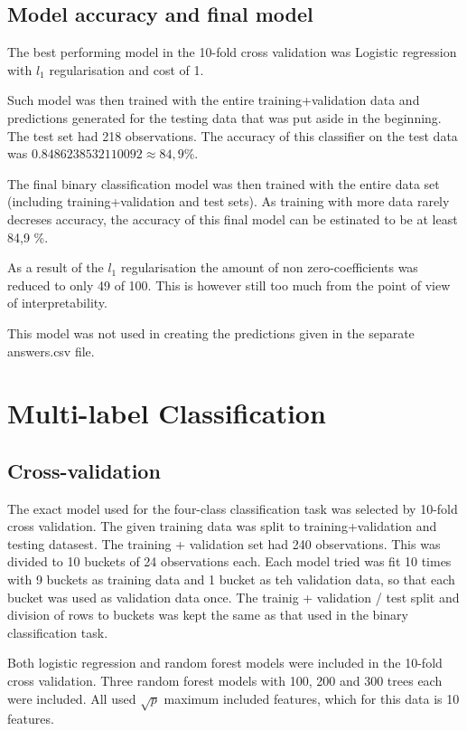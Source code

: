\documentclass[a4size, 12pt]{report}
\begin{document}
	
\subsection*{Model accuracy and final model}
	
	The best performing model in the 10-fold cross validation was Logistic regression with $l_1$ regularisation and cost of 1. 
	
	Such model was then trained with the entire training+validation data and predictions generated for the testing data that was put aside in the beginning. The test set had 218 observations. The accuracy of this classifier on the test data was $0.8486238532110092 \approx 84,9 \%$. 
	
	The final binary classification model was then trained with the entire data set (including training+validation and test sets). As training with more data rarely decreses accuracy, the accuracy of this final model can be estinated to be at least 84,9 \%.  
	
	As a result of the $l_1$ regularisation the amount of non zero-coefficients was reduced to only 49 of 100. This is however still too much from the point of view of interpretability. 
	
	This model was not used in creating the predictions given in the separate answers.csv file.
	
	\section*{Multi-label Classification}
	
	
	\subsection*{Cross-validation}
	
	The exact model used for the four-class classification task was selected by 10-fold cross validation. The given training data was split to training+validation and testing datasest. The training + validation set had 240 observations. This was divided to 10 buckets of 24 observations each. Each model tried was fit 10 times with 9 buckets as training data and 1 bucket as teh validation data, so that each bucket was used as validation data once. The trainig + validation / test split and division of rows to buckets was kept the same as that used in the binary classification task.
	
	Both logistic regression and random forest models were included in the 10-fold cross validation. Three random forest models with 100, 200 and 300 trees each were included. All used $\sqrt{p}$ maximum included features, which for this data is 10 features. 
	
\end{document}
